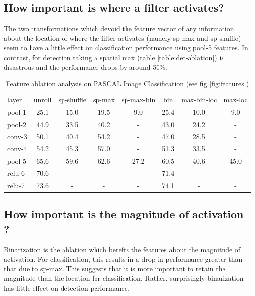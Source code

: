 \documentclass[runningheads]{llncs}
\begin{document}
\subsection{How important is where a filter activates?}
\label{sub:imp-loc}
The two transformations which devoid the feature vector of any information about the location of where the filter activates (namely sp-max and sp-shuffle) seem to have a little effect on classification performance using pool-5 features. In contrast, for detection taking a spatial max (table \ref{table:det-ablation}) is disastrous and the performance drops by around 50\%. 
\setlength{\tabcolsep}{4pt}
\begin{table}
\begin{center}
\caption{Feature ablation analysis on PASCAL Image Classification (see fig \ref{fig:features})}
\label{table:class-ablation}
\begin{tabular}{lccccccc}
\hline\noalign{\smallskip}
layer & unroll & sp-shuffle & sp-max & sp-max-bin & bin & max-bin-loc & max-loc\\
\noalign{\smallskip}
\hline
\noalign{\smallskip}
pool-1 & 25.1 & 15.0 & 19.5 & 9.0 & 25.4 & 10.0 & 9.0\\
pool-2 & 44.9 & 33.5 & 40.2 & - &43.0 & 24.2 & -\\
conv-3 & 50.1 & 40.4 & 54.2 & - &47.0 & 28.5 & -\\
conv-4 & 54.2 & 45.3 & 57.0 & - &51.3 & 33.5 & -\\
pool-5 & 65.6 & 59.6 & 62.6 & 27.2 &60.5 & 40.6 & 45.0\\
relu-6 & 70.6 &  -   &  -   & -& 71.4 &  -   & - \\
relu-7 & 73.6 &  -   &  -   & - &74.1 &  -   & - \\
\hline
\end{tabular}
\end{center}
\end{table}
\setlength{\tabcolsep}{1.4pt}

\subsection{How important is the magnitude of activation ?}
\label{sub:imp-mag}
Binarization is the ablation which berefts the features about the magnitude of activation. For classification, this results in a drop in performance greater than that due to sp-max. This suggests that it is more important to retain the magnitude than the location for classification. Rather, surprisingly binarization has little effect on detection performance.
\end{document}
